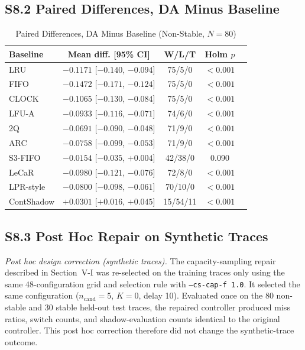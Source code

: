 \documentclass[journal,onecolumn]{IEEEtran}
\begin{document}
\subsection*{S8.2 Paired Differences, DA Minus Baseline}
\begin{table}[!t]
\caption{Paired Differences, DA Minus Baseline (Non-Stable, $N = 80$)}
\label{tab:paired}
\footnotesize
\setlength{\tabcolsep}{4.5pt}
\begin{tabular}{@{}lcccc@{}}
\toprule
Baseline & Mean diff. [95\% CI] & W/L/T & Holm $p$ \\
\midrule
LRU & $-0.1171$ [$-0.140$, $-0.094$] & 75/5/0 & $<0.001$ \\
FIFO & $-0.1472$ [$-0.171$, $-0.124$] & 75/5/0 & $<0.001$ \\
CLOCK & $-0.1065$ [$-0.130$, $-0.084$] & 75/5/0 & $<0.001$ \\
LFU-A & $-0.0933$ [$-0.116$, $-0.071$] & 74/6/0 & $<0.001$ \\
2Q & $-0.0691$ [$-0.090$, $-0.048$] & 71/9/0 & $<0.001$ \\
ARC & $-0.0758$ [$-0.099$, $-0.053$] & 71/9/0 & $<0.001$ \\
S3-FIFO & $-0.0154$ [$-0.035$, $+0.004$] & 42/38/0 & 0.090 \\
LeCaR & $-0.0980$ [$-0.121$, $-0.076$] & 72/8/0 & $<0.001$ \\
LPR-style & $-0.0800$ [$-0.098$, $-0.061$] & 70/10/0 & $<0.001$ \\
ContShadow & $+0.0301$ [$+0.016$, $+0.045$] & 15/54/11 & $<0.001$ \\
\bottomrule
\end{tabular}
\end{table}


\subsection*{S8.3 Post Hoc Repair on Synthetic Traces}
\emph{Post hoc design correction (synthetic traces).} The capacity-sampling
repair described in Section~V-I was re-selected on the training
traces only using the same 48-configuration grid and selection rule with
\texttt{--cs-cap-f 1.0}. It selected the same configuration
($n_{\mathrm{cand}}{=}5$, $K{=}0$, delay 10). Evaluated once on the 80
non-stable and 30 stable held-out test traces, the repaired controller
produced miss ratios, switch counts, and shadow-evaluation counts identical to
the original controller. This post hoc correction therefore did
not change the synthetic-trace outcome.
\end{document}
